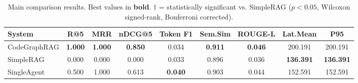 \begin{table}[t]
\centering
\caption{Main comparison results. Best values in \textbf{bold}. 
$\dagger$ = statistically significant vs. SimpleRAG ($p < 0.05$, Wilcoxon signed-rank, Bonferroni corrected).}
\begin{tabular}{lcccccccc}
\toprule
System & R@5 & MRR & nDCG@5 & Token F1 & Sem.Sim & ROUGE-L & Lat.Mean & P95 \\
\midrule
CodeGraphRAG & \textbf{1.000} & \textbf{1.000} & \textbf{0.850} & 0.034 & \textbf{0.911} & \textbf{0.046} & 200.191 & 200.191 \\
SimpleRAG & 0.000 & 0.000 & 0.000 & 0.033 & 0.896 & 0.036 & \textbf{136.391} & \textbf{136.391} \\
SingleAgent & 0.500 & 1.000 & 0.613 & \textbf{0.040} & 0.903 & 0.044 & 152.591 & 152.591 \\
\bottomrule
\end{tabular}
\end{table}